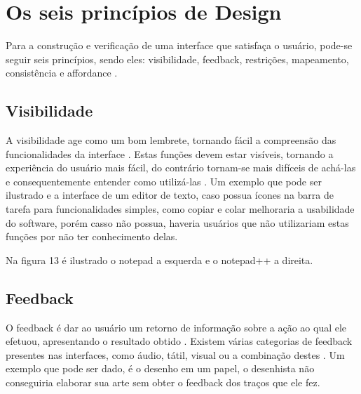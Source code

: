 \documentclass[12pt,oneside,a4paper,chapter=TITLE,section=TITLE,sumario=tradicional]{abntex2}
\begin{document}
\begin{figure}[htb]
\end{figure}

\section{Os seis princípios de Design}
\label{sec:seisprincipios}

Para a construção e verificação de uma interface que satisfaça o usuário, pode-se seguir seis princípios, sendo eles: visibilidade, feedback, restrições, mapeamento, consistência e affordance \cite{norman2002}.

\subsection{Visibilidade}
\label{sec:visibilidade}

A visibilidade age como um bom lembrete, tornando fácil a compreensão das funcionalidades da interface \cite{norman2002}. Estas funções devem estar visíveis, tornando a experiência do usuário mais fácil, do contrário tornam-se mais difíceis de achá-las e consequentemente entender como utilizá-las \cite{agni2015}. Um exemplo que pode ser ilustrado e a interface de um editor de texto, caso possua ícones na barra de tarefa para funcionalidades simples, como copiar e colar melhoraria a usabilidade do software, porém casso não possua, haveria usuários que não utilizariam estas funções por não ter conhecimento delas.

Na figura 13 é ilustrado o notepad a esquerda e o notepad++ a direita.

\begin{figure}[htb]
\end{figure}

\subsection{Feedback}
\label{sec:feedback}

O feedback é dar ao usuário um retorno de informação sobre a ação ao qual ele efetuou, apresentando o resultado obtido \cite{norman2002}. Existem várias categorias de feedback presentes nas interfaces, como áudio, tátil, visual ou a combinação destes \cite{agni2015}. Um exemplo que pode ser dado, é o desenho em um papel, o desenhista não conseguiria elaborar sua arte sem obter o feedback dos traços que ele fez.
\end{document}
